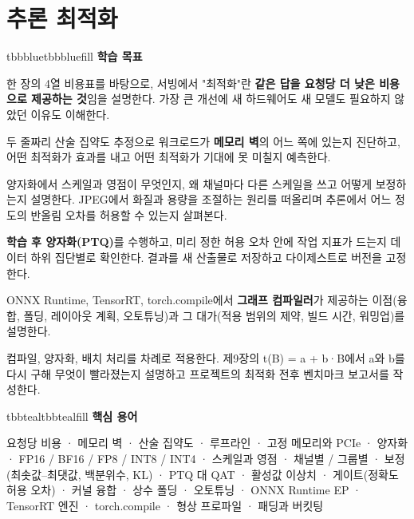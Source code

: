 \setcounter{chapter}{9}
\chapter{추론 최적화}

\begin{calloutbox}{tbbblue}{tbbbluefill}
{\normalsize\bfseries\color{tbbblue}학습 목표}\par\vspace{3pt}
\begin{tbbitemize}
  \item 한 장의 4열 비용표를 바탕으로, 서빙에서 "최적화"란 \textbf{같은 답을 요청당 더 낮은 비용으로 제공하는 것}임을 설명한다. 가장 큰 개선에 새 하드웨어도 새 모델도 필요하지 않았던 이유도 이해한다.
  \item 두 줄짜리 산술 집약도 추정으로 워크로드가 \textbf{메모리 벽}의 어느 쪽에 있는지 진단하고, 어떤 최적화가 효과를 내고 어떤 최적화가 기대에 못 미칠지 예측한다.
  \item 양자화에서 스케일과 영점이 무엇인지, 왜 채널마다 다른 스케일을 쓰고 어떻게 보정하는지 설명한다. JPEG에서 화질과 용량을 조절하는 원리를 떠올리며 추론에서 어느 정도의 반올림 오차를 허용할 수 있는지 살펴본다.
  \item \textbf{학습 후 양자화(PTQ)}를 수행하고, 미리 정한 허용 오차 안에 작업 지표가 드는지 데이터 하위 집단별로 확인한다. 결과를 새 산출물로 저장하고 다이제스트로 버전을 고정한다.
  \item ONNX Runtime, TensorRT, torch.compile에서 \textbf{그래프 컴파일러}가 제공하는 이점(융합, 폴딩, 레이아웃 계획, 오토튜닝)과 그 대가(적용 범위의 제약, 빌드 시간, 워밍업)를 설명한다.
  \item 컴파일, 양자화, 배치 처리를 차례로 적용한다. 제9장의 t(B) = a + b·B에서 a와 b를 다시 구해 무엇이 빨라졌는지 설명하고 프로젝트의 최적화 전후 벤치마크 보고서를 작성한다.
\end{tbbitemize}
\end{calloutbox}

\vspace{3.5pt}

\begin{calloutbox}{tbbteal}{tbbtealfill}
{\normalsize\bfseries\color{tbbteal}핵심 용어}\par\vspace{3pt}
요청당 비용 · 메모리 벽 · 산술 집약도 · 루프라인 · 고정 메모리와 PCIe · 양자화 · FP16 / BF16 / FP8 / INT8 / INT4 · 스케일과 영점 · 채널별 / 그룹별 · 보정(최솟값–최댓값, 백분위수, KL) · PTQ 대 QAT · 활성값 이상치 · 게이트(정확도 허용 오차) · 커널 융합 · 상수 폴딩 · 오토튜닝 · ONNX Runtime EP · TensorRT 엔진 · torch.compile · 형상 프로파일 · 패딩과 버킷팅
\end{calloutbox}

